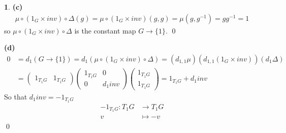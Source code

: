\documentclass[10.5pt]{article}
\theoremstyle{definition}
\newtheorem{pb}{}
\newcommand{\set}[1]{\{#1\}}
\begin{document}
\begin{pb}
        \textbf{(c)}
        \begin{align*}
            \mu\circ(1_G\times inv)\circ \Delta(g) = \mu\circ(1_G\times inv)(g,g) = \mu(g,g^{-1}) = gg^{-1} = 1
        \end{align*}
        so \(\mu\circ(1_G\times inv)\circ \Delta\) is the constant map \(G \to \set{1}\). \qed

        \textbf{(d)}
        \begin{align*}
            0 &= d_1(G \to \set{1}) = d_1(\mu\circ(1_G\times inv)\circ \Delta) = (d_{1,1}\mu)(d_{1,1}(1_G\times inv))(d_1\Delta) \\
            &= \begin{pmatrix} 1_{T_1G} &1_{T_1G} \end{pmatrix} \begin{pmatrix} 1_{T_1G} & 0\\ 0 & d_1 inv\end{pmatrix}\begin{pmatrix} 1_{T_1G}\\ 1_{T_1G} \end{pmatrix} = 1_{T_1G} + d_1 inv
        \end{align*}
        So that \(d_1 inv = - 1_{T_1G}\)
        \begin{align*}
            - 1_{T_1G}: T_1G &\to T_1G \\
            v &\mapsto -v
        \end{align*} \qed
    \end{pb}
\end{document}
